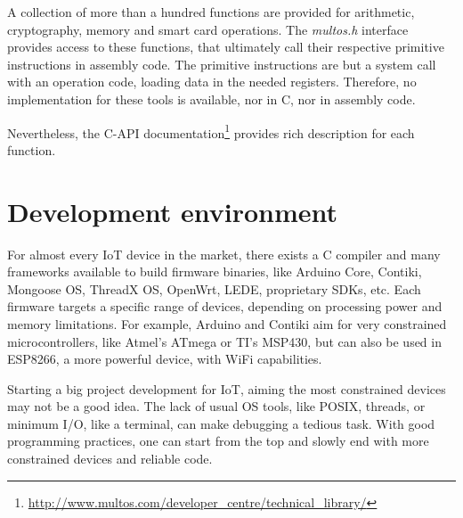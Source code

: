 A collection of more than a hundred functions are provided for arithmetic, cryptography, memory and smart card operations. The \textit{multos.h} interface provides access to these functions, that ultimately call their respective primitive instructions in assembly code. The primitive instructions are but a system call with an operation code, loading data in the needed registers. Therefore,  no implementation for these tools is available, nor in C, nor in assembly code.

Nevertheless, the C-API documentation\footnote{\url{http://www.multos.com/developer_centre/technical_library/}} provides rich description for each function.




\hfil

\section{Development environment}


For almost every IoT device in the market, there exists a C compiler and many frameworks available to build firmware binaries, like Arduino Core, Contiki, Mongoose OS, ThreadX OS, OpenWrt, LEDE, proprietary SDKs, etc. Each firmware targets a specific range of devices, depending on processing power and memory limitations. For example, Arduino and Contiki aim for very constrained microcontrollers, like Atmel's ATmega or TI's MSP430, but can also be used in ESP8266, a more powerful device, with WiFi capabilities.

Starting a big project development for \ac{IoT}, aiming the most constrained devices may not be a good idea. The lack of usual OS tools, like POSIX, threads, or minimum I/O, like a terminal, can make debugging a tedious task. With good programming practices, one can start from the top and slowly end with more constrained devices and reliable code.



